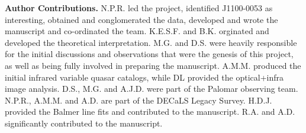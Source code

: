 {\bf Author Contributions.}   
N.P.R. led the project, identified J1100-0053 as interesting, obtained and conglomerated the data, developed and wrote the manuscript and co-ordinated the team.
K.E.S.F. and B.K. orginated and developed the theoretical interpretation. 
M.G. and D.S. were heavily responsible for the initial discussions and observations that were the genesis of
this project, as well as being fully involved in preparing the manuscript. 
A.M.M. produced the initial infrared variable quasar catalogs, while DL provided the optical+infra image analysis. 
D.S., M.G. and A.J.D. were part of the Palomar observing team.
N.P.R., A.M.M. and A.D. are part of the DECaLS Legacy Survey. 
H.D.J. provided the Balmer line fits and contributed to the manuscript.
R.A. and A.D. significantly contributed to the manuscript.
\smallskip
\smallskip

